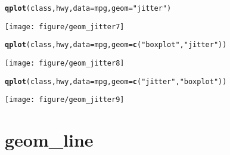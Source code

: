 \documentclass[a4paper,titlepage]{tufte-handout}\usepackage{graphicx, color}
\makeatletter
\def\maxwidth{ %
  \ifdim\Gin@nat@width>\linewidth
    \linewidth
  \else
    \Gin@nat@width
  \fi
}
\newcommand{\hlfunctioncall}[1]{\textcolor[rgb]{0.501960784313725,0,0.329411764705882}{\textbf{#1}}}%
\newcommand{\hlstring}[1]{\textcolor[rgb]{0.6,0.6,1}{#1}}%
\newenvironment{kframe}{%
 \def\at@end@of@kframe{}%
 \ifinner\ifhmode%
  \def\at@end@of@kframe{\end{minipage}}%
  \begin{minipage}{\columnwidth}%
 \fi\fi%
 \def\FrameCommand##1{\hskip\@totalleftmargin \hskip-\fboxsep
 \colorbox{shadecolor}{##1}\hskip-\fboxsep
     \hskip-\linewidth \hskip-\@totalleftmargin \hskip\columnwidth}%
 \MakeFramed {\advance\hsize-\width
   \@totalleftmargin\z@ \linewidth\hsize
   \@setminipage}}%
 {\par\unskip\endMakeFramed%
 \at@end@of@kframe}
\newenvironment{knitrout}{}{} %
\makeatother
\begin{document}
\begin{knitrout}
\begin{kframe}
\begin{alltt}
\hlfunctioncall{qplot}(class, hwy, data = mpg, geom = \hlstring{"jitter"})
\end{alltt}
\end{kframe}\texttt{[image: figure/geom\_jitter7]} \begin{kframe}\begin{alltt}
\hlfunctioncall{qplot}(class, hwy, data = mpg, geom = \hlfunctioncall{c}(\hlstring{"boxplot"}, \hlstring{"jitter"}))
\end{alltt}
\end{kframe}\texttt{[image: figure/geom\_jitter8]} \begin{kframe}\begin{alltt}
\hlfunctioncall{qplot}(class, hwy, data = mpg, geom = \hlfunctioncall{c}(\hlstring{"jitter"}, \hlstring{"boxplot"}))
\end{alltt}
\end{kframe}\texttt{[image: figure/geom\_jitter9]} 
\end{knitrout}


\section{geom\_line}
\end{document}
